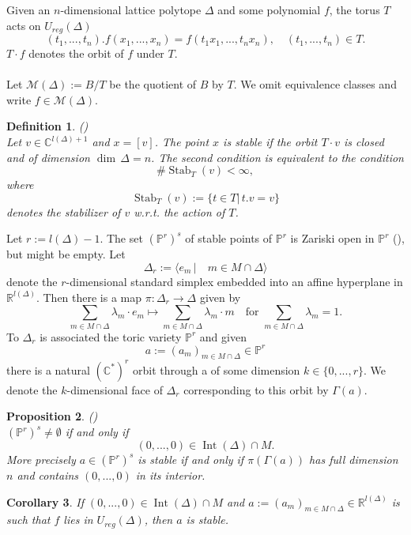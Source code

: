 \documentclass[12pt, english]{article}
\newtheorem{definition}{Definition}[section]
\newtheorem{proposition}[definition]{Proposition}
\newtheorem{corollar}[definition]{Corollary}
\DeclareMathOperator{\Stab}{Stab}
\DeclareMathOperator{\Int}{Int}
\begin{document}
Given an $n$-dimensional lattice polytope $\Delta$ and some polynomial $f$, the torus $T$ acts on $U_{reg}(\Delta)$
\[ (t_1,...,t_n).f(x_1,...,x_n) = f(t_1x_1,...,t_n x_n), \quad (t_1,...,t_n) \in T.  \]
$T \cdot f$ denotes the orbit of $f$ under $T$. \\ \\
Let $\mathcal{M}(\Delta) := B/T$ be the quotient of $B$ by $T$. We omit equivalence classes and write $f \in \mathcal{M}(\Delta)$.

\begin{definition} \label{definition_stable_points} (\cite[Def.1.7]{MuFo82}) \\
	Let $v \in \mathbb{C}^{l(\Delta) +1}$ and $x = [v]$. The point $x$ is  stable if the orbit $T \cdot v$ is closed and of dimension $\dim \, \Delta = n$. The second condition is equivalent to the condition
	\[ \# \Stab_T(v) < \infty, \]
	where 
	\[  \Stab_T(v) := \{ t \in T| \, t.v = v \} \]
	denotes the stabilizer of $v$ w.r.t. the action of $T$.
\end{definition}

Let $r:= l(\Delta)-1$. The set $(\mathbb{P}^r)^s$ of stable points of $\mathbb{P}^r$ is Zariski open in $\mathbb{P}^r$ (\cite[§4]{MuFo82}), but might be empty. Let 
\[ \Delta_r := \langle e_m \, | \quad  m \in M \cap \Delta \rangle \] 
denote the $r$-dimensional standard simplex embedded into an affine hyperplane in $\mathbb{R}^{l(\Delta)}$. Then there is a map $\pi: \Delta_r \rightarrow \Delta$ given by
\[ \sum\limits_{m \in M \cap \Delta} \lambda_m \cdot e_m \mapsto \sum\limits_{m \in M \cap \Delta} \lambda_m \cdot m \quad \textrm{for } \sum\limits_{m \in M \cap \Delta} \lambda_m = 1. \]
To $\Delta_r$ is associated the toric variety $\mathbb{P}^r$ and given 
\[ a:= (a_m)_{m \in M \cap \Delta} \in \mathbb{P}^r \] 
there is a natural $(\mathbb{C}^*)^r$ orbit through a of some dimension $k \in \{0,...,r\}$. We denote the $k$-dimensional face of $\Delta_r$ corresponding to this orbit by $\Gamma(a)$.

\begin{proposition} (\cite[Prop.3.5]{KSZ91}) \\
	$(\mathbb{P}^r)^s \neq \emptyset$ if and only if 
	\[  (0,...,0) \in \Int(\Delta) \cap M. \] 
	More precisely $a \in (\mathbb{P}^r)^s$ is stable if and only if $\pi(\Gamma(a))$ has full dimension $n$ and contains $(0,...,0)$ in its interior.
\end{proposition}

\begin{corollar} \label{corollary_f_nondegenerate_then_f_stable}
	If $(0,...,0) \in \Int(\Delta) \cap M$ and $a:= (a_m)_{m \in M \cap \Delta} \in \mathbb{R}^{l(\Delta)}$ is such that $f$  lies in $ U_{reg}(\Delta)$, then $a$ is stable.
\end{corollar}
\end{document}
